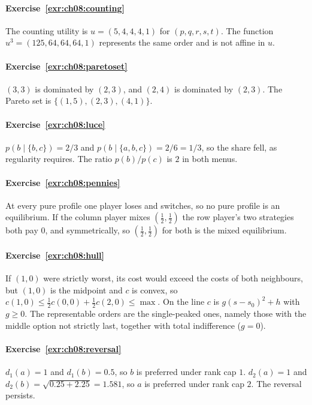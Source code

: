 
\paragraph{Exercise~\ref{exr:ch08:counting}}
The counting utility is $u=(5,4,4,4,1)$ for $(p,q,r,s,t)$. The function $u^3=(125,64,64,64,1)$ represents the same order and is not affine in $u$.

\paragraph{Exercise~\ref{exr:ch08:paretoset}}
$(3,3)$ is dominated by $(2,3)$, and $(2,4)$ is dominated by $(2,3)$. The Pareto set is $\{(1,5),(2,3),(4,1)\}$.

\paragraph{Exercise~\ref{exr:ch08:luce}}
$p(b\mid\{b,c\})=2/3$ and $p(b\mid\{a,b,c\})=2/6=1/3$, so the share fell, as regularity requires. The ratio $p(b)/p(c)$ is $2$ in both menus.

\paragraph{Exercise~\ref{exr:ch08:pennies}}
At every pure profile one player loses and switches, so no pure profile is an equilibrium. If the column player mixes $(\tfrac12,\tfrac12)$ the row player's two strategies both pay $0$, and symmetrically, so $(\tfrac12,\tfrac12)$ for both is the mixed equilibrium.

\paragraph{Exercise~\ref{exr:ch08:hull}}
If $(1,0)$ were strictly worst, its cost would exceed the costs of both neighbours, but $(1,0)$ is the midpoint and $c$ is convex, so $c(1,0)\le\tfrac12c(0,0)+\tfrac12c(2,0)\le\max$. On the line $c$ is $g(s-s_0)^2+h$ with $g\ge0$. The representable orders are the single-peaked ones, namely those with the middle option not strictly last, together with total indifference ($g=0$).

\paragraph{Exercise~\ref{exr:ch08:reversal}}
$d_1(a)=1$ and $d_1(b)=0.5$, so $b$ is preferred under rank cap $1$. $d_2(a)=1$ and $d_2(b)=\sqrt{0.25+2.25}=1.581$, so $a$ is preferred under rank cap $2$. The reversal persists.

